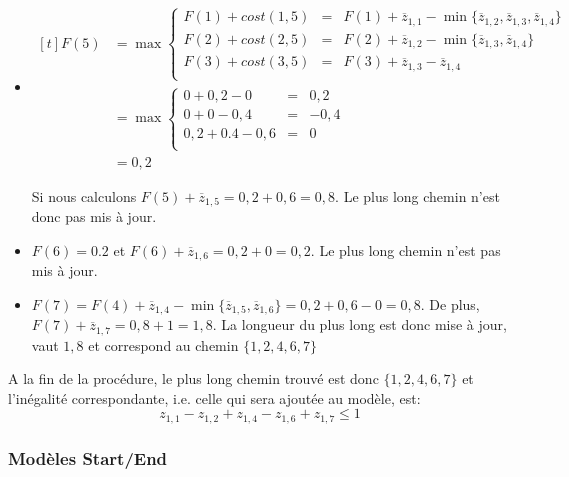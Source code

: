\begin{ex}
\begin{itemize}
\item $\begin{aligned}[t] 
    F(5) &=  \max \left\{
        \begin{array}{lcl}
          F(1) + cost (1,5) & = & F(1) + \overline{z}_{1,1}  -
                                  \min\{\overline{z}_{1,2},\overline{z}_{1,3},\overline{z}_{1,4}\} 
          \\ 
          F(2) + cost (2,5) &= & F(2) + \overline{z}_{1,2} -
                             \min\{\overline{z}_{1,3}, \overline{z}_{1,4}\}\\
          F(3) + cost (3,5) &= & F(3) + \overline{z}_{1,3} -
                             \overline{z}_{1,4} \\
        \end{array} \right.\\
      &=  \max \left\{ 
        \begin{array}{lcl}
          0 + 0,2 - 0 &=& 0,2 \\
          0 + 0 - 0,4 &= &-0,4 \\
          0,2 + 0.4 - 0,6 &= & 0 \\ 
        \end{array} \right.\\
    &=  0,2
  \end{aligned}$

  Si nous calculons $F(5)+\overline{z}_{1,5}=0,2+0,6=0,8$. Le plus
  long chemin n'est donc pas mis à jour. 

\item $F(6)= 0.2$ et $F(6)+\overline{z}_{1,6}=0,2+0=0,2$. Le plus long  
  chemin n'est pas mis à jour. 
\item $F(7) = F(4) +\overline{z}_{1,4} -
  \min\{\overline{z}_{1,5},\overline{z}_{1,6}\}= 0,2 + 0,6 - 0 =
  0,8$. De plus, $F(7)+\overline{z}_{1,7}=0,8+1=1,8$. La longueur du
  plus long est donc mise à jour, vaut $1,8$ et correspond au chemin $\{1,2,4,6,7\}$
\end{itemize}

A la fin de la procédure, le plus long chemin trouvé est donc
$\{1,2,4,6,7\}$ et l'inégalité correspondante, i.e. celle qui sera
ajoutée au modèle, est:
\[  z_{1,1} - z_{1,2} + z_{1,4} - z_{1,6} + z_{1,7} \le 1  \]
\end{ex}  

\subsubsection{Modèles Start/End}

